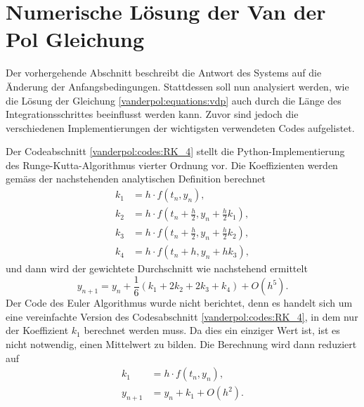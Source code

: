 %
%
%
\section{Numerische Lösung der Van der Pol Gleichung
\label{vanderpol:section:loesung}}
Der vorhergehende Abschnitt beschreibt die Antwort des Systems auf die Änderung der Anfangsbedingungen. Stattdessen soll nun analysiert werden, wie die Lösung der Gleichung \ref{vanderpol:equations:vdp} auch durch die Länge des Integrationsschrittes beeinflusst werden kann. Zuvor sind jedoch die verschiedenen Implementierungen der wichtigsten verwendeten Codes aufgelistet.

Der Codeabschnitt \ref{vanderpol:codes:RK_4} stellt die Python-Implementierung des Runge-Kutta-Algorithmus vierter Ordnung vor. Die Koeffizienten werden gemäss der nachstehenden analytischen Definition berechnet
\begin{align*}
k_1 &= h \cdot f(t_n, y_n),\\
k_2 &= h \cdot f\left(t_n + \frac{h}{2}, y_n + \frac{h}{2} k_1\right), \\
k_3 &= h \cdot f\left(t_n + \frac{h}{2}, y_n + \frac{h}{2} k_2\right), \\
k_4 &= h \cdot f(t_n + h, y_n + h k_3),
\end{align*}
und dann wird der gewichtete Durchschnitt wie nachstehend ermittelt
\begin{equation}
y_{n+1} = y_n + \frac{1}{6}(k_1 + 2k_2 + 2k_3 + k_4) +O(h^5).
\end{equation}
Der Code des Euler Algorithmus wurde nicht berichtet, denn es handelt sich um eine vereinfachte Version des Codesabschnitt \ref{vanderpol:codes:RK_4}, in dem nur der Koeffizient $k_1$ berechnet werden muss. Da dies ein einziger Wert ist, ist es nicht notwendig, einen Mittelwert zu bilden. Die Berechnung wird dann reduziert auf
\begin{align*}
k_1 &= h \cdot f(t_n, y_n), \\
y_{n+1} &= y_n + k_1 +O(h^2).
\end{align*}

